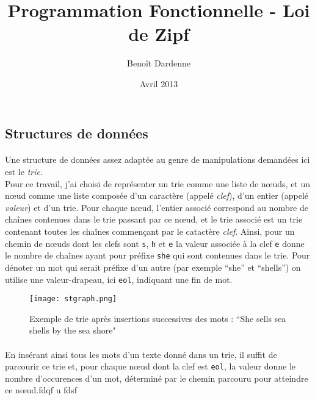 \documentclass{article}
\title{Programmation Fonctionnelle - Loi de Zipf}
\author{Benoît Dardenne}
\date{Avril 2013}
\begin{document}
\maketitle


\subsection*{Structures de données}

\paragraph{} Une structure de données assez adaptée au genre de manipulations demandées ici est le \emph{trie}.\\
Pour ce travail, j'ai choisi de représenter un trie comme une liste de nœuds, 
et un nœud comme une liste 
composée d'un caractère (appelé \emph{clef}), d'un entier (appelé \emph{valeur}) et d'un trie. 
Pour chaque nœud, l'entier associé correspond
au nombre de chaînes contenues dans le trie passant par ce nœud, et le trie associé est un trie 
contenant toutes les chaînes commençant par le catactère \emph{clef}. 
Ainsi, pour un chemin de nœuds dont les clefs sont \verb#s#, \verb#h# et \verb#e# 
la valeur associée à la clef \verb#e# donne le nombre de chaînes ayant pour préfixe \verb#she#
qui sont contenues dans le trie.
Pour dénoter un mot qui serait préfixe d'un autre (par exemple ``she'' et ``shells'') on utilise une
valeur-drapeau, ici \verb#eol#, indiquant une fin de mot.

\begin{figure}[H]
   \centering
   \texttt{[image: stgraph.png]}
   \label{fig:trie}
   \caption{Exemple de trie après insertions successives des mots : ``She sells sea shells by the sea shore"}
\end{figure}

\paragraph{} En insérant ainsi tous les mots d'un texte donné dans un trie, il suffit de parcourir ce trie et,
pour chaque nœud dont la clef est \verb#eol#, la valeur donne le nombre d'occurences d'un mot, déterminé 
par le chemin parcouru pour atteindre ce nœud.fdqf 
u
fdsf
\end{document}
